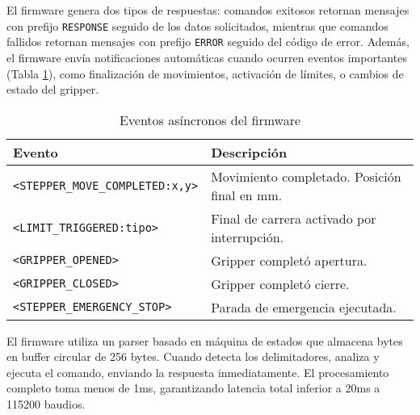 El firmware genera dos tipos de respuestas: comandos exitosos retornan mensajes con prefijo \texttt{RESPONSE} seguido de los datos solicitados, mientras que comandos fallidos retornan mensajes con prefijo \texttt{ERROR} seguido del código de error. Además, el firmware envía notificaciones automáticas cuando ocurren eventos importantes (Tabla \ref{tab:eventos_asincronos}), como finalización de movimientos, activación de límites, o cambios de estado del gripper.

\begin{table}[H]
\centering
\begin{tabular}{|l|p{8cm}|}
\hline
\textbf{Evento} & \textbf{Descripción} \\
\hline
\texttt{<STEPPER\_MOVE\_COMPLETED:x,y>} & Movimiento completado. Posición final en mm. \\
\hline
\texttt{<LIMIT\_TRIGGERED:tipo>} & Final de carrera activado por interrupción. \\
\hline
\texttt{<GRIPPER\_OPENED>} & Gripper completó apertura. \\
\hline
\texttt{<GRIPPER\_CLOSED>} & Gripper completó cierre. \\
\hline
\texttt{<STEPPER\_EMERGENCY\_STOP>} & Parada de emergencia ejecutada. \\
\hline
\end{tabular}
\caption{Eventos asíncronos del firmware}
\label{tab:eventos_asincronos}
\end{table}

El firmware utiliza un parser basado en máquina de estados que almacena bytes en buffer circular de 256 bytes. Cuando detecta los delimitadores, analiza y ejecuta el comando, enviando la respuesta inmediatamente. El procesamiento completo toma menos de 1ms, garantizando latencia total inferior a 20ms a 115200 baudios.
